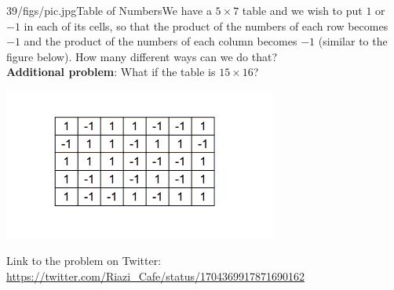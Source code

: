 \begin{problem}{39/figs/pic.jpg}{Table of Numbers}We have a $5 \times 7$ table and we wish to put $1$ or $-1$ in each of its cells, so that the product of the numbers of each row becomes $-1$ and the product of the numbers of each column becomes $-1$ (similar to the figure below). How many different ways can we do that?\\[0.2cm]

\textbf{Additional problem}: What if the table is $15 \times 16$?

\begin{center}
	\includegraphics[width=9cm]{39/figs/39_grid.png}
\end{center}

Link to the problem on Twitter:  \url{https://twitter.com/Riazi_Cafe/status/1704369917871690162}\end{problem}